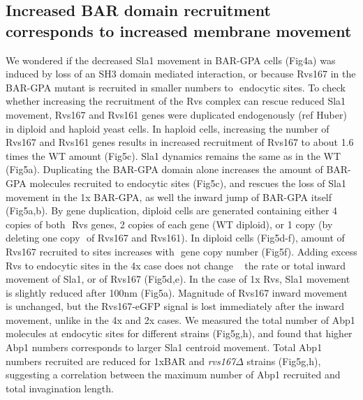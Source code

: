 \documentclass[9pt,lineno]{elife}
\begin{document}
	
\subsection{Increased BAR domain recruitment corresponds to increased membrane movement}
We wondered if the decreased Sla1 movement in BAR-GPA cells (Fig4a) was induced by loss of an SH3 domain mediated interaction, or because Rvs167 in the BAR-GPA mutant is recruited in smaller numbers to  endocytic sites. To check whether increasing the recruitment of the Rvs complex can rescue reduced Sla1 movement, Rvs167 and Rvs161 genes were duplicated endogenously (ref Huber) in diploid and haploid yeast cells. In haploid cells, increasing the number of Rvs167 and Rvs161 genes results in increased recruitment of Rvs167 to about 1.6 times the WT amount (Fig5c). Sla1 dynamics remains the same as in the WT (Fig5a). Duplicating the BAR-GPA domain alone increases the amount of BAR-GPA molecules recruited to endocytic sites (Fig5c), and rescues the loss of Sla1 movement in the 1x BAR-GPA, as well the inward jump of BAR-GPA itself (Fig5a,b). By gene duplication, diploid cells are generated containing either 4 copies of both  Rvs genes, 2 copies of each gene (WT diploid), or 1 copy (by deleting one copy  of Rvs167 and Rvs161). In diploid cells (Fig5d-f), amount of Rvs167 recruited to sites increases with  gene copy number (Fig5f). Adding excess Rvs to endocytic sites in the 4x case does not change   the rate or total inward movement of Sla1, or of Rvs167 (Fig5d,e). In the case of 1x Rvs, Sla1 movement is slightly reduced after 100nm (Fig5a). Magnitude of Rvs167 inward movement is unchanged, but the Rvs167-eGFP signal is lost immediately after the inward movement, unlike in the 4x and 2x cases.
We measured the total number of Abp1 molecules at endocytic sites for different strains (Fig5g,h), and found that higher Abp1 numbers corresponds to larger Sla1 centroid movement. Total Abp1 numbers recruited are reduced for 1xBAR and \textit{rvs167$\Delta$} strains (Fig5g,h), suggesting a correlation between the maximum number of Abp1 recruited and total invagination length.  
\end{document}
